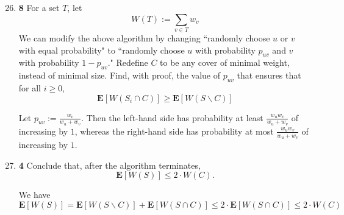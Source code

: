\documentclass[12pt]{article}
\theoremstyle{plain}
\theoremstyle{definition}
\theoremstyle{remark}
\newcommand{\E}{\textbf{E}}
\newcommand{\pts}[1]{\lbrack\textbf{#1}\rbrack}
\begin{document}
\begin{enumerate}
\setcounter{enumi}{25}
\item \pts{8} For a set $T$, let \[W(T):=\sum_{v\in T}w_v\] We can modify the above algorithm by changing ``randomly choose $u$ or $v$ with equal probability" to ``randomly choose $u$ with probability $p_{uv}$ and $v$ with probability $1-p_{uv}$." Redefine $C$ to be any cover of minimal weight, instead of minimal size. Find, with proof, the value of $p_{uv}$ that ensures that for all $i\ge0$, \[\E[W(S_i\cap C)]\ge\E[W(S\backslash C)]\]

\begin{tcolorbox}
Let $p_{uv}:=\frac{w_v}{w_u+w_v}$. Then the left-hand side has probability at least $\frac{w_uw_v}{w_u+w_v}$ of increasing by $1$, whereas the right-hand side has probability at most $\frac{w_uw_v}{w_u+w_v}$ of increasing by $1$.
\end{tcolorbox}

\item \pts{4} Conclude that, after the algorithm terminates, \[\E[W(S)]\le2\cdot W(C).\]

\begin{tcolorbox}
We have \[\E[W(S)]=\E[W(S\backslash C)]+\E[W(S\cap C)]\le2\cdot\E[W(S\cap C)]\le2\cdot W(C)\]
\end{tcolorbox}
\end{enumerate}
\end{document}
